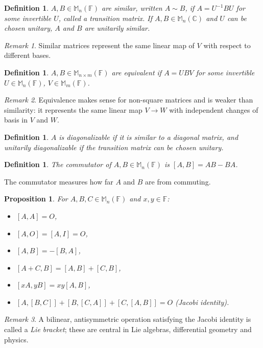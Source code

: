 \documentclass[12pt]{article}
\theoremstyle{breakplain}
\newtheorem{prop}[theorem]{Proposition}
\theoremstyle{breakdef}
\newtheorem{definition}[theorem]{Definition}
\theoremstyle{remark}
\newtheorem*{remark}{Remark}
\begin{document}
\begin{definition}
    $A,B\in\mathbb{M}_n(\mathbb{F})$ are \emph{similar}, written $A\sim B$, if $A=U^{-1}BU$ for some invertible $U$, called a \emph{transition matrix}. If $A,B\in\mathbb{M}_n(\mathbb{C})$ and $U$ can be chosen unitary, $A$ and $B$ are \emph{unitarily similar}.
\end{definition}
\begin{remark}
    Similar matrices represent the same linear map of $V$ with respect to different bases.
\end{remark}
\begin{definition}
    $A,B\in\mathbb{M}_{n\times m}(\mathbb{F})$ are \emph{equivalent} if $A=UBV$ for some invertible $U\in\mathbb{M}_n(\mathbb{F})$, $V\in\mathbb{M}_m(\mathbb{F})$.
\end{definition}
\begin{remark}
    Equivalence makes sense for non-square matrices and is weaker than similarity: it represents the same linear map $V\to W$ with independent changes of basis in $V$ and $W$.
\end{remark}
\begin{definition}
    $A$ is \emph{diagonalizable} if it is similar to a diagonal matrix, and \emph{unitarily diagonalizable} if the transition matrix can be chosen unitary.
\end{definition}
\begin{definition}
    The \emph{commutator} of $A,B\in \mathbb{M}_n(\mathbb{F})$ is $[A,B]=AB-BA$.
\end{definition}
The commutator measures how far $A$ and $B$ are from commuting.
\begin{prop}
    For $A,B,C\in \mathbb{M}_n(\mathbb{F})$ and $x,y \in \mathbb{F}$:
    \begin{itemize}
        \item $[A,A]=O$,
        \item $[A,O]=[A,I]=O$,
        \item $[A,B]=-[B,A]$,
        \item $[A+C,B]=[A,B]+[C,B]$,
        \item $[x A,y B]=xy[A,B]$,
        \item $[A,[B,C]]+[B,[C,A]]+[C,[A,B]]=O$ \textup{(Jacobi identity)}.
    \end{itemize}
\end{prop}
\begin{remark}
    A bilinear, antisymmetric operation satisfying the Jacobi identity is called a \emph{Lie bracket}; these are central in Lie algebras, differential geometry and physics.
\end{remark}
\end{document}
